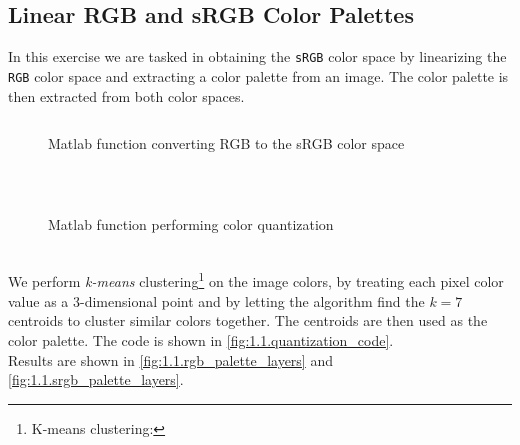 \documentclass[tikz,14pt,fleqn]{article}
\begin{document}
\subsection{Linear RGB and sRGB Color Palettes}
In this exercise we are tasked in obtaining the \verb|sRGB| color space by linearizing the \verb|RGB| color space and extracting a color palette from an image. The color palette is then extracted from both color spaces. 
\begin{figure}[h!]
    \vspace*{-0.2cm}
    \inputminted[firstline=134, lastline=145, frame=lines, framesep=2mm, fontsize=\small ]{matlab}{../src/ex1.m}
    \vspace*{-0.5cm}
    \caption{Matlab function converting RGB to the sRGB color space}
    \label{fig:1.1.linearize_code}
\end{figure}\\
\begin{figure}[h!]
    \vspace*{-0.2cm}
    \inputminted[firstline=161, frame=lines, framesep=2mm, fontsize=\small ]{matlab}{../src/ex1.m}
    \vspace*{-0.5cm}
    \caption{Matlab function performing color quantization}
    \label{fig:1.1.quantization_code}
\end{figure}\\
We perform \textit{k-means} clustering\footnote{K-means clustering: } on the image colors, by treating each pixel color value as a 3-dimensional point and by letting the algorithm find the $k=7$ centroids to cluster similar colors together. The centroids are then used as the color palette. The code is shown in \autoref{fig:1.1.quantization_code}.\\
Results are shown in \autoref{fig:1.1.rgb_palette_layers} and \autoref{fig:1.1.srgb_palette_layers}.
\end{document}
